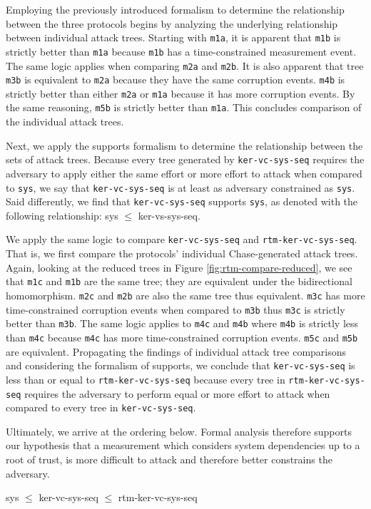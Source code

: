 \documentclass[runningheads]{llncs}
\theoremstyle{definition}
\begin{document}
Employing the previously introduced formalism to determine the relationship between the three protocols begins by analyzing the underlying relationship between individual attack trees. Starting with \texttt{m1a}, it is apparent that \texttt{m1b} is strictly better than \texttt{m1a} because \texttt{m1b} has a time-constrained measurement event. The same logic applies when comparing \texttt{m2a} and \texttt{m2b}. It is also apparent that tree \texttt{m3b} is equivalent to \texttt{m2a} because they have the same corruption events. \texttt{m4b} is strictly better than either \texttt{m2a} or \texttt{m1a} because it has more corruption events. By the same reasoning, \texttt{m5b} is strictly better than \texttt{m1a}. This concludes comparison of the individual attack trees.

Next, we apply the supports formalism to determine the relationship between the sets of attack trees. Because every tree generated by \texttt{ker-vc-sys-seq} requires the adversary to apply either the same effort or more effort to attack when compared to \texttt{sys}, we say that \texttt{ker-vc-sys-seq} is at least as adversary constrained as \texttt{sys}. Said differently, we find that \texttt{ker-vc-sys-seq} supports \texttt{sys}, as denoted with the following relationship: sys $\leq$ ker-vs-sys-seq.

We apply the same logic to compare \texttt{ker-vc-sys-seq} and \texttt{rtm-ker-vc-sys-seq}. That is, we first compare the protocols' individual Chase-generated attack trees. Again, looking at the reduced trees in Figure \ref{fig:rtm-compare-reduced}, we see that  \texttt{m1c} and  \texttt{m1b} are the same tree; they are equivalent under the bidirectional homomorphism. \texttt{m2c} and \texttt{m2b} are also the same tree thus equivalent. \texttt{m3c} has more time-constrained corruption events when compared to  \texttt{m3b} thus  \texttt{m3c} is strictly better than \texttt{m3b}. The same logic applies to \texttt{m4c} and  \texttt{m4b} where  \texttt{m4b} is strictly less than  \texttt{m4c} because  \texttt{m4c} has more time-constrained corruption events.  \texttt{m5c} and \texttt{m5b} are equivalent. Propagating the findings of individual attack tree comparisons and considering the formalism of supports, we conclude that \texttt{ker-vc-sys-seq} is less than or equal to \texttt{rtm-ker-vc-sys-seq} because every tree in \texttt{rtm-ker-vc-sys-seq} requires the adversary to perform equal or more effort to attack when compared to every tree in  \texttt{ker-vc-sys-seq}. 

Ultimately, we arrive at the ordering below. Formal analysis therefore supports our hypothesis that a measurement which considers system dependencies up to a root of trust, is more difficult to attack and therefore better constrains the adversary. 
\begin{center}
    sys $\leq$ ker-vc-sys-seq $\leq$ rtm-ker-vc-sys-seq
\end{center}
\end{document}
